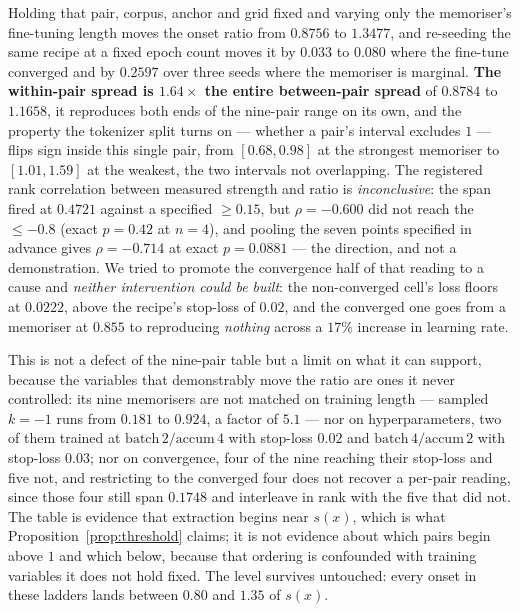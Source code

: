 Holding that pair, corpus, anchor and grid fixed and varying only the memoriser's fine-tuning length
moves the onset ratio from $0.8756$ to $1.3477$, and re-seeding the same recipe at a fixed epoch
count moves it by $0.033$ to $0.080$ where the fine-tune converged and by $0.2597$ over three seeds
where the memoriser is marginal. \textbf{The within-pair spread is $1.64\times$ the entire
between-pair spread} of $0.8784$ to $1.1658$, it reproduces both ends of the nine-pair range on its
own, and the property the tokenizer split turns on --- whether a pair's interval excludes $1$ ---
flips sign inside this single pair, from $[0.68, 0.98]$ at the strongest memoriser to
$[1.01, 1.59]$ at the weakest, the two intervals not overlapping. The registered rank correlation
between measured strength and ratio is \emph{inconclusive}: the span fired at $0.4721$ against a
specified $\ge 0.15$, but $\rho = -0.600$ did not reach the $\le -0.8$ (exact $p = 0.42$ at $n=4$),
and pooling the seven points specified in advance gives $\rho = -0.714$ at exact $p = 0.0881$ ---
the direction, and not a demonstration. We tried to promote the convergence half of that reading to
a cause and \emph{neither intervention could be built}: the non-converged cell's loss floors at
$0.0222$, above the recipe's stop-loss of $0.02$, and the converged one goes from a memoriser at
$0.855$ to reproducing \emph{nothing} across a $17\%$ increase in learning rate.

This is not a defect of the nine-pair table but a limit on what it can support, because the
variables that demonstrably move the ratio are ones it never controlled: its nine memorisers are
not matched on training length --- sampled $k=-1$ runs from $0.181$ to $0.924$, a factor of $5.1$
--- nor on hyperparameters, two of them trained at
$\mathrm{batch}\,2/\mathrm{accum}\,4$ with stop-loss $0.02$ and $\mathrm{batch}\,4/\mathrm{accum}\,2$
with stop-loss $0.03$; nor on convergence, four of the nine reaching their stop-loss and five not,
and restricting to the converged four does not recover a per-pair reading, since those four still
span $0.1748$ and interleave in rank with the five that did not. The table is evidence that
extraction begins near $s(x)$, which is what Proposition~\ref{prop:threshold} claims; it is not
evidence about which pairs begin above $1$ and which below, because that ordering is confounded
with training variables it does not hold fixed. The level survives untouched: every onset in these
ladders lands between $0.80$ and $1.35$ of $s(x)$.

